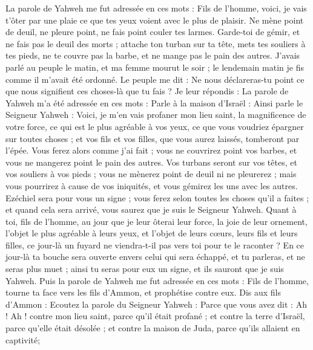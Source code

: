 \begin{multicols}{2}
La parole de Yahweh me fut adressée en ces mots :
Fils de l'homme, voici, je vais t'ôter par une plaie ce que tes yeux voient avec le plus de plaisir. Ne mène point de deuil, ne pleure point, ne fais point couler tes larmes.
Garde-toi de gémir, et ne fais pas le deuil des morts ; attache ton turban sur ta tête, mets tes souliers à tes pieds, ne te couvre pas la barbe, et ne mange pas le pain des autres.
J'avais parlé au peuple le matin, et ma femme mourut le soir ; le lendemain matin je fis comme il m'avait été ordonné.
Le peuple me dit : Ne nous déclareras-tu point ce que nous signifient ces choses-là que tu fais ?
Je leur répondis : La parole de Yahweh m'a été adressée en ces mots :
Parle à la maison d'Israël : Ainsi parle le Seigneur Yahweh : Voici, je m'en vais profaner mon lieu saint, la magnificence de votre force, ce qui est le plus agréable à vos yeux, ce que vous voudriez épargner sur toutes choses ; et vos fils et vos filles, que vous aurez laissés, tomberont par l'épée.
Vous ferez alors comme j'ai fait ; vous ne couvrirez point vos barbes, et vous ne mangerez point le pain des autres.
Vos turbans seront sur vos têtes, et vos souliers à vos pieds ; vous ne mènerez point de deuil ni ne pleurerez ; mais vous pourrirez à cause de vos iniquités, et vous gémirez les uns avec les autres. Ezéchiel sera pour vous un signe ; 
vous ferez selon toutes les choses qu'il a faites ; et quand cela sera arrivé, vous saurez que je suis le Seigneur Yahweh.
Quant à toi, fils de l'homme, au jour que je leur ôterai leur force, la joie de leur ornement, l'objet le plus agréable à leurs yeux, et l'objet de leurs cœurs, leurs fils et leurs filles,
ce jour-là un fuyard ne viendra-t-il pas vers toi pour te le raconter ?
En ce jour-là ta bouche sera ouverte envers celui qui sera échappé, et tu parleras, et ne seras plus muet ; ainsi tu seras pour eux un signe, et ils sauront que je suis Yahweh.
\VerseOne{}Puis la parole de Yahweh me fut adressée en ces mots :
Fils de l'homme, tourne ta face vers les fils d'Ammon, et prophétise contre eux.
Dis aux fils d'Ammon : Ecoutez la parole du Seigneur Yahweh : Parce que vous avez dit : Ah ! Ah ! contre mon lieu saint, parce qu'il était profané ; et contre la terre d'Israël, parce qu'elle était désolée ; et contre la maison de Juda, parce qu'ils allaient en captivité;

\end{multicols}
